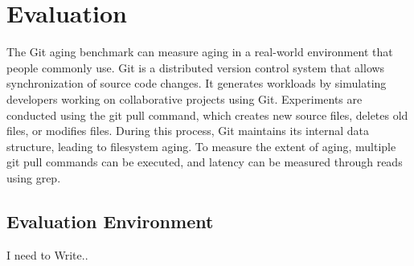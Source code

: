 \section{Evaluation}\label{s:eval}

The Git aging benchmark\cite{conway:login17,senescence:fast17} can measure aging in a real-world environment that people commonly use.
Git is a distributed version control system that allows synchronization of source code changes.
It generates workloads by simulating developers working on collaborative projects using Git.
Experiments are conducted using the git pull command, which creates new source files, deletes old files, or modifies files. During this process, Git maintains its internal data structure, leading to filesystem aging.
To measure the extent of aging, multiple git pull commands can be executed, and latency can be measured through reads using grep.






\subsection{Evaluation Environment}

I need to Write..

